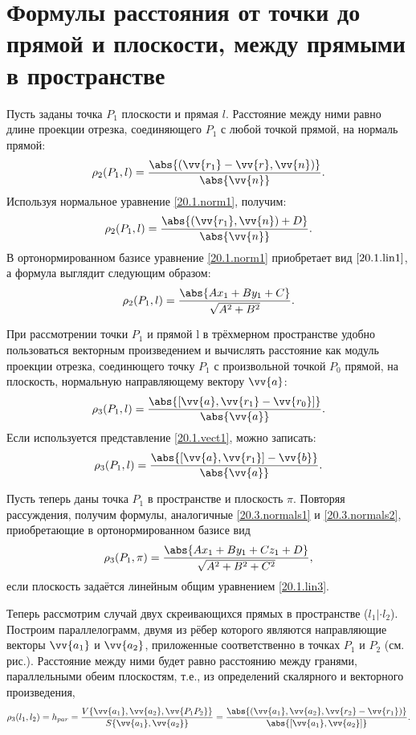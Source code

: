 \section{Формулы расстояния от точки до прямой и плоскости, между прямыми в пространстве}
  Пусть заданы точка $P_1$ плоскости и прямая $l$. Расстояние между ними равно длине проекции отрезка, соединяющего $P_1$ с любой точкой прямой, на нормаль прямой:
  \begin{equation}\label{20.3.normals1}
  \rho_2 (P_1,l) = \dfrac{ \abs{(\vv{r_1}-\vv{r},\vv{n})} }{ \abs{\vv{n}} }.
  \end{equation}   
  Используя нормальное уравнение \ref{20.1.norm1}, получим:
  \begin{equation}\label{20.3.normals2}
  \rho_2 (P_1,l) = \dfrac{\abs{(\vv{r_1},\vv{n})+D}}{\abs{\vv{n}}}.
  \end{equation}
  В ортонормированном базисе уравнение \ref{20.1.norm1} приобретает вид $\ref{20.1.lin1}$, а формула выглядит следующим образом:
  \begin{equation}
  \rho_2 (P_1,l) = \dfrac{\abs{Ax_1+By_1+C}}{\sqrt{A^2+B^2}}.
  \end{equation}
  
  При рассмотрении точки $P_1$ и прямой l в трёхмерном пространстве удобно пользоваться векторным произведением и вычислять расстояние как модуль проекции отрезка, соединющего точку $P_1$ с произвольной точкой $P_0$ прямой, на плоскость, нормальную направляющему вектору $\vv{a}$:
  \begin{equation}
  \rho_3 (P_1,l) = \dfrac{\abs{[\vv{a},\vv{r_1}-\vv{r_0}]}}{\abs{\vv{a}}}.
  \end{equation}
  Если используется представление \ref{20.1.vect1}, можно записать:
  \begin{equation}
  \rho_3 (P_1,l) = \dfrac{\abs{[\vv{a},\vv{r_1}]-\vv{b}}}{\abs{\vv{a}}}.
  \end{equation}

  Пусть теперь даны точка $P_1$ в пространстве и плоскость $\pi$. Повторяя рассуждения, получим формулы, аналогичные \ref{20.3.normals1} и \ref{20.3.normals2}, приобретающие в ортонормированном базисе вид
  \begin{equation}
  \rho_3 (P_1,\pi) = \dfrac{\abs{Ax_1+By_1+Cz_1+D}}{\sqrt{A^2+B^2+C^2}},
  \end{equation}
  если плоскость задаётся линейным общим уравнением \ref{20.1.lin3}.

  Теперь рассмотрим случай двух скреивающихся прямых в пространстве ($l_1|\cdot l_2$). Построим параллелограмм, двумя из рёбер которого являются направляющие векторы $\vv{a_1}$ и $\vv{a_2}$, приложенные соответственно в точках $P_1$ и $P_2$ (см. рис.). Расстояние между ними будет равно расстоянию между гранями, параллельными обеим плоскостям, т.е., из определений скалярного и векторного произведения,  
  \begin{equation}
  \rho_3(l_1,l_2)=h_{par}=\dfrac{V \lbrace \vv{a_1},\vv{a_2},\vv{P_1P_2} \rbrace}{S \lbrace \vv{a_1},\vv{a_2} \rbrace}=\dfrac{\abs{(\vv{a_1},\vv{a_2},\vv{r_2}-\vv{r_1})}}{\abs{[\vv{a_1},\vv{a_2}]}}.
  \end{equation}   
\label{ch20pict3}